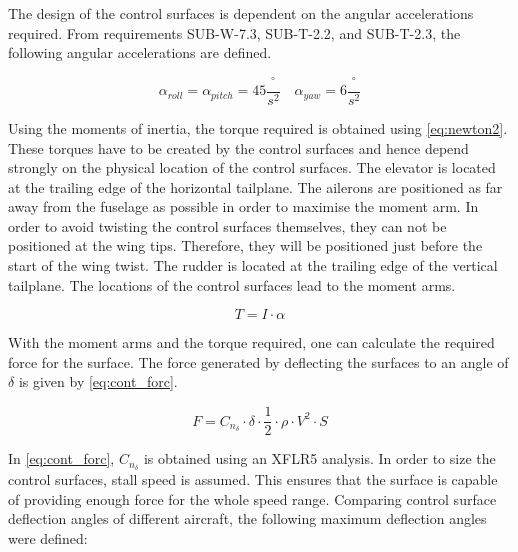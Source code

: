 The design of the control surfaces is dependent on the angular accelerations required. From requirements SUB-W-7.3, SUB-T-2.2, and SUB-T-2.3, the following angular accelerations are defined.

\begin{equation*}
    \alpha_{roll} = \alpha_{pitch} = 45 \frac{^\circ}{s^2} \quad \alpha_{yaw} = 6 \frac{^\circ}{s^2}
\end{equation*}


Using the moments of inertia, the torque required is obtained using \autoref{eq:newton2}. These torques have to be created by the control surfaces and hence depend strongly on the physical location of the control surfaces. The elevator is located at the trailing edge of the horizontal tailplane. The ailerons are positioned as far away from the fuselage as possible in order to maximise the moment arm. In order to avoid twisting the control surfaces themselves, they can not be positioned at the wing tips. Therefore, they will be positioned just before the start of the wing twist. The rudder is located at the trailing edge of the vertical tailplane. The locations of the control surfaces lead to the moment arms.

\begin{equation}
    T = I \cdot \alpha
    \label{eq:newton2}
\end{equation}

With the moment arms and the torque required, one can calculate the required force for the surface. The force generated by deflecting the surfaces to an angle of $\delta$ is given by \autoref{eq:cont_forc}.

\begin{equation}
    F = C_{n_{\delta}}\cdot \delta\cdot\frac{1}{2}\cdot\rho\cdot V^2 \cdot S
    \label{eq:cont_forc}
\end{equation}

In \autoref{eq:cont_forc}, $C_{n_{\delta}}$ is obtained using an XFLR5 analysis. In order to size the control surfaces, stall speed is assumed. This ensures that the surface is capable of providing enough force for the whole speed range. Comparing control surface deflection angles of different aircraft, the following maximum deflection angles were defined: 

